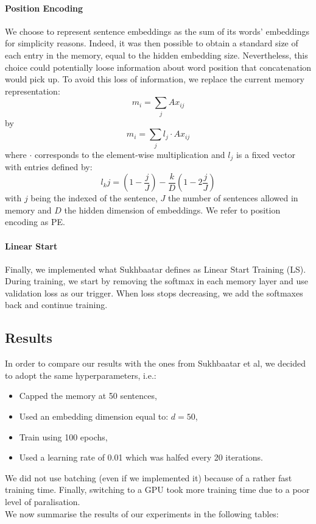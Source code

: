 \documentclass[twoside,11pt]{article}
\begin{document}
\paragraph{Position Encoding}
We choose to represent sentence embeddings as the sum of its words' embeddings for simplicity reasons. Indeed, it was then possible to obtain a standard size of each entry in the memory, equal to the hidden embedding size. Nevertheless, this choice could potentially loose information about word position that concatenation would pick up. To avoid this loss of information, we replace the current memory representation:$$m_i = \sum_j Ax_{ij}$$ by $$m_i = \sum_j l_j\cdot A x_{ij}$$ where $\cdot$ corresponds to the element-wise multiplication and $l_j$ is a fixed vector with entries defined by: $$l_kj = (1-\frac{j}{J})-\frac{k}{D}(1-2\frac{j}{J})$$ with $j$ being the indexed of the sentence, $J$ the number of sentences allowed in memory and $D$ the hidden dimension of embeddings. We refer to position encoding as PE.
\paragraph{Linear Start}
Finally, we implemented what Sukhbaatar defines as Linear Start Training (LS). During training, we start by removing the softmax in each memory layer and use validation loss as our trigger. When loss stops decreasing, we add the softmaxes back and continue training. 

\subsection{Results}

In order to compare our results with the ones from Sukhbaatar et al, we decided to adopt the same hyperparameters, i.e.:
\begin{itemize}
\item Capped the memory at 50 sentences,
\item Used an embedding dimension equal to: $d=50$,
\item Train using 100 epochs,
\item Used a learning rate of 0.01 which was halfed every 20 iterations.
\end{itemize}
\noindent We did not use batching (even if we implemented it) because of a rather fast training time. Finally, switching to a GPU took more training time due to a poor level of paralisation.\\

\noindent We now summarise the results of our experiments in the following tables:
\end{document}
